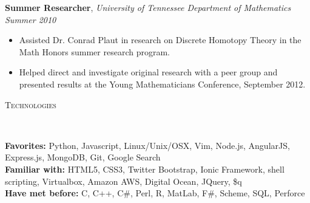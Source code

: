 \documentclass[9pt]{article}
\newenvironment{changemargin}[2]{%
  \begin{list}{}{%
    \setlength{\topsep}{0pt}%
    \setlength{\leftmargin}{#1}%
    \setlength{\rightmargin}{#2}%
    \setlength{\listparindent}{\parindent}%
    \setlength{\itemindent}{\parindent}%
    \setlength{\parsep}{\parskip}%
  }%
  \item[]}{\end{list}
}
\newcommand{\lineover}{
	\begin{changemargin}{-0.05in}{-0.05in}
		\vspace*{-8pt}
		\hrulefill \\
		\vspace*{-2pt}
	\end{changemargin}
}
\newcommand{\header}[1]{
	\begin{changemargin}{-0.5in}{-0.5in}
		\scshape{#1}\\
  	\lineover
	\end{changemargin}
}
\newenvironment{body} {
	\vspace*{-16pt}
	\begin{changemargin}{-0.25in}{-0.5in}
  }	
	{\end{changemargin}
}
\begin{document}
\begin{body}
	\textbf {Summer Researcher}, \emph{University of Tennessee Department of Mathematics} \hfill \emph{Summer 2010}\\
	\vspace*{-4pt}
	\begin{itemize} \itemsep -0pt
		\item Assisted Dr. Conrad Plaut in research on Discrete Homotopy Theory in the Math Honors summer research program.
		\item Helped direct and investigate original research with a peer group and presented results at the Young Mathematicians Conference, September 2012.
	\end{itemize}
	\begin{comment}
	\textbf {Assistant Waterfront Director}, \emph{Kia Kima Scout Reservation} \hfill \emph{Summers, 2008 - 09}\\
	\vspace*{-4pt}
	\begin{itemize} \itemsep -0pt
		\item Instructed waterfront merit badges, including lifesaving and CPR skills.
		\item Managed other instructors and ensured safety with both preventative and remedial action.
	\end{itemize}
	\end{comment}
	
\end{body}

\smallskip



\header{Technologies}

\begin{body}
	\vspace{14pt}
	\textbf{Favorites:}{} Python, Javascript, Linux/Unix/OSX, Vim, Node.js, AngularJS, Express.js, MongoDB, Git, Google Search\\
	\medskip
	\textbf{Familiar with:}{} HTML5, CSS3, Twitter Bootstrap, Ionic Framework, shell scripting, Virtualbox, Amazon AWS,
    Digital Ocean, JQuery, \$q\\
	\medskip
	\textbf{Have met before:}{} C, C++, C\#, Perl, R, MatLab, F\#, Scheme, SQL, Perforce \\
	\medskip
\end{body}
\end{document}
